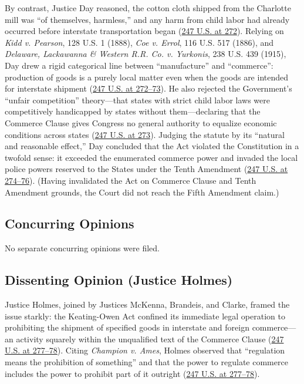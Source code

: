 \documentclass[12pt]{article}
\begin{document}
By contrast, Justice Day reasoned, the cotton cloth shipped from the Charlotte mill was ``of themselves, harmless,'' and any harm from child labor had already occurred before interstate transportation began (\href{https://supreme.justia.com/cases/federal/us/247/251/}{247 U.S. at 272}). Relying on \textit{Kidd v. Pearson}, 128 U.S. 1 (1888), \textit{Coe v. Errol}, 116 U.S. 517 (1886), and \textit{Delaware, Lackawanna \& Western R.R. Co. v. Yurkonis}, 238 U.S. 439 (1915), Day drew a rigid categorical line between ``manufacture'' and ``commerce'': production of goods is a purely local matter even when the goods are intended for interstate shipment (\href{https://supreme.justia.com/cases/federal/us/247/251/}{247 U.S. at 272--73}). He also rejected the Government's ``unfair competition'' theory---that states with strict child labor laws were competitively handicapped by states without them---declaring that the Commerce Clause gives Congress no general authority to equalize economic conditions across states (\href{https://supreme.justia.com/cases/federal/us/247/251/}{247 U.S. at 273}). Judging the statute by its ``natural and reasonable effect,'' Day concluded that the Act violated the Constitution in a twofold sense: it exceeded the enumerated commerce power and invaded the local police powers reserved to the States under the Tenth Amendment (\href{https://supreme.justia.com/cases/federal/us/247/251/}{247 U.S. at 274--76}). (Having invalidated the Act on Commerce Clause and Tenth Amendment grounds, the Court did not reach the Fifth Amendment claim.)

\subsection{Concurring Opinions}
No separate concurring opinions were filed.

\subsection{Dissenting Opinion (Justice Holmes)}
Justice Holmes, joined by Justices McKenna, Brandeis, and Clarke, framed the issue starkly: the Keating-Owen Act confined its immediate legal operation to prohibiting the shipment of specified goods in interstate and foreign commerce---an activity squarely within the unqualified text of the Commerce Clause (\href{https://supreme.justia.com/cases/federal/us/247/251/}{247 U.S. at 277--78}). Citing \textit{Champion v. Ames}, Holmes observed that ``regulation means the prohibition of something'' and that the power to regulate commerce includes the power to prohibit part of it outright (\href{https://supreme.justia.com/cases/federal/us/247/251/}{247 U.S. at 277--78}).
\end{document}

